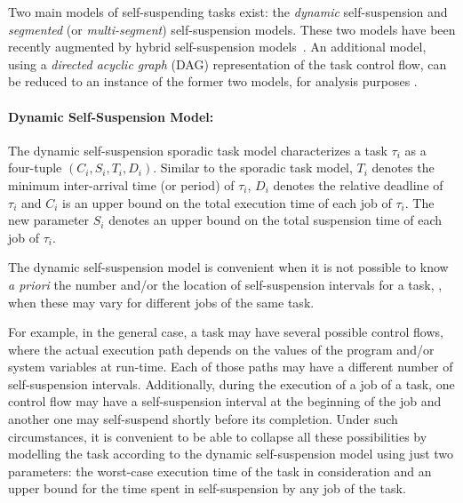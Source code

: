   
Two main models of self-suspending tasks exist: the \emph{dynamic} self-suspension and \emph{segmented} (or \emph{multi-segment})
self-suspension models. These two models have been recently augmented by hybrid self-suspension models~\cite{DBLP:conf/rtcsa/BruggenHC17}.
An additional model, using a \emph{directed acyclic graph} (DAG) representation of the task control flow, can be 
reduced to an instance of the former two models, for analysis purposes \cite{bletsas:thesis}.

\paragraph{Dynamic Self-Suspension Model:} 

The {dynamic} self-suspension sporadic task model characterizes a task $\tau_i$ as a four-tuple $(C_i,S_i,T_i,D_i)$. Similar to the sporadic task model, $T_i$ denotes the 
minimum inter-arrival time (or period) of $\tau_i$, $D_i$ denotes the relative deadline of $\tau_i$ and $C_i$ is an upper bound on 
the total execution time of each job of $\tau_i$. The new parameter $S_i$ denotes an upper bound on the total suspension time of each job of $\tau_i$.  

The dynamic self-suspension model is convenient when it is not possible to know \textit{a priori} the number and/or the location of self-suspension intervals for a task, \eg, when these may vary for different jobs of the same task.

For example, in the general case, a task may have several possible control flows, where the actual execution path depends on the values
of the program and/or system variables at run-time. Each of those paths may have a different
number of self-suspension intervals. Additionally, during the execution of a job of a task, one control flow may have a self-suspension interval at the beginning of the job and
another one may self-suspend shortly before its completion. Under such circumstances, it is convenient to be able to collapse all these possibilities
by modelling the task according to the dynamic self-suspension model using
just two parameters: the worst-case execution time of the task in consideration and an upper bound for the time spent in self-suspension by any job of the task. %

